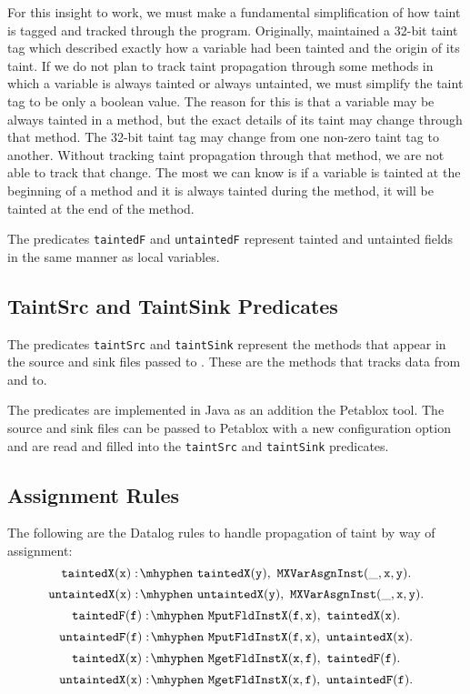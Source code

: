 For this insight to work, we must make a fundamental simplification of
how taint is tagged and tracked through the program. Originally,
\phosphor{} maintained a 32-bit taint tag which described exactly how
a variable had been tainted and the origin of its taint. If we do not
plan to track taint propagation through some methods in which a
variable is always tainted or always untainted, we must simplify the
taint tag to be only a boolean value. The reason for this is that a
variable may be always tainted in a method, but the exact details of
its taint may change through that method. The 32-bit taint tag may
change from one non-zero taint tag to another. Without tracking taint
propagation through that method, we are not able to track that
change. The most we can know is if a variable is tainted at the
beginning of a method and it is always tainted during the method, it
will be tainted at the end of the method.

The predicates \texttt{taintedF} and \texttt{untaintedF} represent
tainted and untainted fields in the same manner as local variables.
\subsection{TaintSrc and TaintSink Predicates}
The predicates \texttt{taintSrc} and \texttt{taintSink} represent the
methods that appear in the source and sink files passed to
\phosphor{}. These are the methods that \phosphor{} tracks data from
and to.

The predicates are implemented in Java as an addition the Petablox
tool. The source and sink files can be passed to Petablox with a new
configuration option and are read and filled into the
\texttt{taintSrc} and \texttt{taintSink} predicates.
\subsection{Assignment Rules}
The following are the Datalog rules to handle propagation of taint by
way of assignment:
\begin{equation}
  \mathtt{taintedX(x) \is taintedX(y) \also MXVarAsgnInst(\_,x,y).}
\end{equation}
\begin{equation}
  \mathtt{untaintedX(x) \is untaintedX(y) \also
    MXVarAsgnInst(\_,x,y).}
\end{equation}
\begin{equation}
  \mathtt{taintedF(f) \is MputFldInstX(f,x) \also taintedX(x).}
\end{equation}
\begin{equation}
  \mathtt{untaintedF(f) \is MputFldInstX(f,x) \also untaintedX(x).}
\end{equation}
\begin{equation}
  \mathtt{taintedX(x) \is MgetFldInstX(x,f) \also taintedF(f).}
\end{equation}
\begin{equation}
  \mathtt{untaintedX(x) \is MgetFldInstX(x,f) \also untaintedF(f).}
\end{equation}

